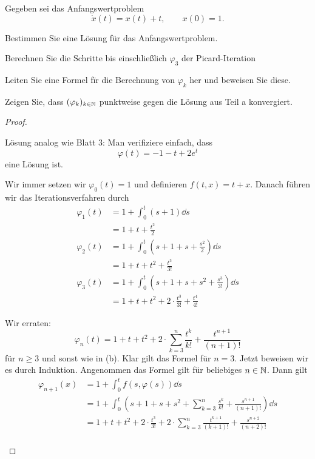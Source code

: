 \begin{Problem}
	Gegeben sei das Anfangswertproblem
	\[
		\dot{x}(t)=x(t)+t,\qquad x(0)=1
	.\] 
	\begin{parts}
		\item Bestimmen Sie eine L\"{o}sung f\"{u}r das Anfangswertproblem.
		\item Berechnen Sie die Schritte bis einschließlich $\varphi_3$ der Picard-Iteration
		\item Leiten Sie eine Formel f\"{i}r die Berechnung von $\varphi_k$ her und beweisen Sie diese.
		\item Zeigen Sie, dass $(\varphi_k)_{k\in \mathbb{N}}$ punktweise gegen die L\"{o}sung aus Teil a konvergiert.
	\end{parts}
\end{Problem}
\begin{proof}
	\begin{parts}
	\item L\"{o}sung analog wie Blatt 3: Man verifiziere einfach, dass
		\[
		\varphi(t)=-1-t+2e^t
	\]
	eine L\"{o}sung ist.
\item Wir immer setzen wir $\varphi_0(t)=1$ und definieren $f(t,x)=t+x$. Danach f\"{u}hren wir das Iterationsverfahren durch
	\begin{align*}
		\varphi_1(t)&=1+\int_0^t (s+1)\dd{s}\\
			    &=1+t+\frac{t^2}{2}\\
		\varphi_2(t)&=1+\int_0^t \left( s+1+s+\frac{s^2}{2} \right)\dd{s}\\
			    &=1+t+t^2 + \frac{t^3}{3!}\\
		\varphi_3(t)&=1+\int_0^t\left( s+1+s+s^2+\frac{s^3}{3!} \right) \dd{s}\\
			    &= 1+t+t^2+2\cdot \frac{t^3}{3!}+\frac{t^4}{4!}
	\end{align*}
\item Wir erraten:
	\[
		\varphi_n(t) = 1+t+t^2 +2\cdot \sum_{k=3}^{n} \frac{t^k}{k!}+\frac{t^{n+1}}{(n+1)!}
\]
f\"{u}r $n\ge 3$ und sonst wie in (b). Klar gilt das Formel f\"{u}r $n=3$. Jetzt beweisen wir es durch Induktion. Angenommen das Formel gilt f\"{u}r beliebiges $n\in \mathbb{N}$. Dann gilt
\begin{align*}
	\varphi_{n+1}(x)&=1+\int_0^t f(s, \varphi(s))\dd{s}\\
			&=1+\int_0^t \left(s + 1 + s + s^2 + \sum_{k=3}^{n} \frac{s^k}{k!}+\frac{s^{n+1}}{(n+1)!} \right)\dd{s}\\ 
			&=1+t+t^2 + 2\cdot \frac{t^3}{3!}+2\cdot \sum_{k=3}^{n} \frac{t^{k+1}}{(k+1)!}+\frac{s^{n+2}}{(n+2)!}\\

\end{align*}
\end{parts}
\end{proof}
